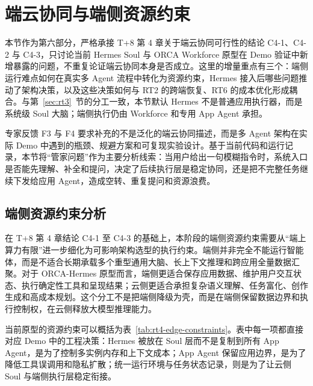 \section{端云协同与端侧资源约束}
\label{sec:rt4}

本节作为第六部分，严格承接 T+8 第 4 章关于端云协同可行性的结论 C4-1、C4-2 与 C4-3，只讨论当前 Hermes Soul 与 ORCA Workforce 原型在 Demo 验证中新增暴露的问题，不重复论证端云协同本身是否成立。这里的增量重点有三个：端侧运行难点如何在真实多 Agent 流程中转化为资源约束，Hermes 接入后哪些问题推动了架构决策，以及这些决策如何与 RT2 的跨端恢复、RT6 的成本优化形成耦合。与第~\ref{sec:rt3}~节的分工一致，本节默认 Hermes 不是普通应用执行器，而是系统级 Soul 大脑；端侧执行仍由 Workforce 和专用 App Agent 承担。

专家反馈 F3 与 F4 要求补充的不是泛化的端云协同描述，而是多 Agent 架构在实际 Demo 中遇到的瓶颈、规避方案和可复现实验设计。基于当前代码和运行记录，本节将“管家问题”作为主要分析线索：当用户给出一句模糊指令时，系统入口是否能先理解、补全和提问，决定了后续执行层是稳定协同，还是把不完整任务继续下发给应用 Agent，造成空转、重复提问和资源浪费。

\subsection{端侧资源约束分析}

在 T+8 第 4 章结论 C4-1 至 C4-3 的基础上，本阶段的端侧资源约束需要从“端上算力有限”进一步细化为可影响架构选型的执行约束。端侧并非完全不能运行智能体，而是不适合长期承载多个重型通用大脑、长上下文推理和跨应用全量数据汇聚。对于 ORCA-Hermes 原型而言，端侧更适合保存应用数据、维护用户交互状态、执行确定性工具和呈现结果；云侧更适合承担复杂语义理解、任务富化、创作生成和高成本规划。这个分工不是把端侧降级为壳，而是在端侧保留数据边界和执行控制权，在云侧释放大模型推理能力。

当前原型的资源约束可以概括为表~\ref{tab:rt4-edge-constraints}。表中每一项都直接对应 Demo 中的工程决策：Hermes 被放在 Soul 层而不是复制到所有 App Agent，是为了控制多实例内存和上下文成本；App Agent 保留应用边界，是为了降低工具误调用和隐私扩散；统一运行环境与任务状态记录，则是为了让云侧 Soul 与端侧执行层稳定衔接。

